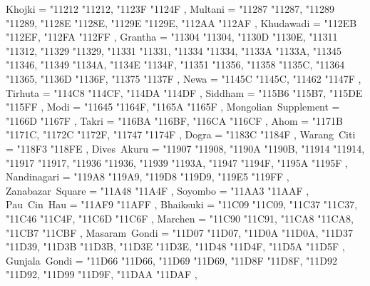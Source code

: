 {    Khojki                                         = { {"11212} {"11212}, {"1123F} {"1124F} },
    Multani                                        = { {"11287} {"11287}, {"11289} {"11289}, {"1128E} {"1128E}, {"1129E} {"1129E}, {"112AA} {"112AF} },
    Khudawadi                                      = { {"112EB} {"112EF}, {"112FA} {"112FF} },
    Grantha                                        = { {"11304} {"11304}, {"1130D} {"1130E}, {"11311} {"11312}, {"11329} {"11329}, {"11331} {"11331}, {"11334} {"11334}, {"1133A} {"1133A}, {"11345} {"11346}, {"11349} {"1134A}, {"1134E} {"1134F}, {"11351} {"11356}, {"11358} {"1135C}, {"11364} {"11365}, {"1136D} {"1136F}, {"11375} {"1137F} },
    Newa                                           = { {"1145C} {"1145C}, {"11462} {"1147F} },
    Tirhuta                                        = { {"114C8} {"114CF}, {"114DA} {"114DF} },
    Siddham                                        = { {"115B6} {"115B7}, {"115DE} {"115FF} },
    Modi                                           = { {"11645} {"1164F}, {"1165A} {"1165F} },
    Mongolian~Supplement                           = { {"1166D} {"1167F} },
    Takri                                          = { {"116BA} {"116BF}, {"116CA} {"116CF} },
    Ahom                                           = { {"1171B} {"1171C}, {"1172C} {"1172F}, {"11747} {"1174F} },
    Dogra                                          = { {"1183C} {"1184F} },
    Warang~Citi                                    = { {"118F3} {"118FE} },
    Dives~Akuru                                    = { {"11907} {"11908}, {"1190A} {"1190B}, {"11914} {"11914}, {"11917} {"11917}, {"11936} {"11936}, {"11939} {"1193A}, {"11947} {"1194F}, {"1195A} {"1195F} },
    Nandinagari                                    = { {"119A8} {"119A9}, {"119D8} {"119D9}, {"119E5} {"119FF} },
    Zanabazar~Square                               = { {"11A48} {"11A4F} },
    Soyombo                                        = { {"11AA3} {"11AAF} },
    Pau~Cin~Hau                                    = { {"11AF9} {"11AFF} },
    Bhaiksuki                                      = { {"11C09} {"11C09}, {"11C37} {"11C37}, {"11C46} {"11C4F}, {"11C6D} {"11C6F} },
    Marchen                                        = { {"11C90} {"11C91}, {"11CA8} {"11CA8}, {"11CB7} {"11CBF} },
    Masaram~Gondi                                  = { {"11D07} {"11D07}, {"11D0A} {"11D0A}, {"11D37} {"11D39}, {"11D3B} {"11D3B}, {"11D3E} {"11D3E}, {"11D48} {"11D4F}, {"11D5A} {"11D5F} },
    Gunjala~Gondi                                  = { {"11D66} {"11D66}, {"11D69} {"11D69}, {"11D8F} {"11D8F}, {"11D92} {"11D92}, {"11D99} {"11D9F}, {"11DAA} {"11DAF} },
}

